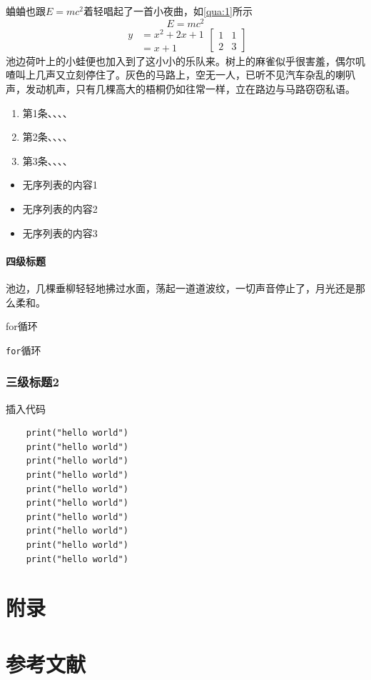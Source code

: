 \documentclass[UTF8]{ctexart}
\begin{document}
蛐蛐也跟$E = mc^2$着轻唱起了一首小夜曲，如\ref{qua:1}所示
\begin{equation}
    E=mc^2
\end{equation}
\begin{equation}
    \begin{aligned}
        y &= x^2+2x+1   \\
        &=x+1
    \end{aligned}
    \begin{bmatrix}
        1 & 1\\ 
        2 & 3
    \end{bmatrix}
    \label{qua:1}
\end{equation}
池边荷叶上的小蛙便也加入到了这小小的乐队来。树上的麻雀似乎很害羞，偶尔叽喳叫上几声又立刻停住了。灰色的马路上，空无一人，已听不见汽车杂乱的喇叭声，发动机声，只有几棵高大的梧桐仍如往常一样，立在路边与马路窃窃私语。

\begin{enumerate}
    \item 第1条、、、、
    \item 第2条、、、、
    \item 第3条、、、、
\end{enumerate}

\newpage

 \begin{itemize}
    \item 无序列表的内容1
    \item 无序列表的内容2
    \item 无序列表的内容3
 \end{itemize}


\paragraph{四级标题}
池边，几棵垂柳轻轻地拂过水面，荡起一道道波纹，一切声音停止了，月光还是那么柔和。

for循环


\verb|for|循环

\subsubsection{三级标题2}
 插入代码

\begin{verbatim}
    print("hello world")
    print("hello world")
    print("hello world")
    print("hello world")
    print("hello world")
    print("hello world")
    print("hello world")
    print("hello world")
    print("hello world")
    print("hello world")
\end{verbatim}


\section*{附录}


\newpage

\section*{参考文献}
\end{document}
